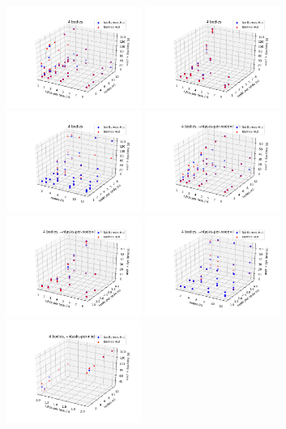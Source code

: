 \documentclass[11pt,a4paper]{article}
\begin{document}
\includegraphics[width=4.4cm]{4-cpusPerTask-nodes}
\includegraphics[width=4.4cm]{4-cpusPerTask-tasksPerNode}
\includegraphics[width=4.4cm]{4-nodes-tasksPerNode}
\includegraphics[width=4.4cm]{4-cpusPerTask-nodes-elide_8_tpn}
\includegraphics[width=4.4cm]{4-cpusPerTask-tasksPerNode-elide_8_tpn}
\includegraphics[width=4.4cm]{4-nodes-tasksPerNode-elide_8_tpn}
\includegraphics[width=4.4cm]{4-cpusPerTask-nodes-just_1_tpn}
\end{document}
